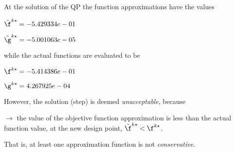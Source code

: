 At the solution of the QP the function approximations have the values

$\tilde \f^{k\star} = -5.429334e-01$

$\tilde \g^{k\star} = -5.001063e-05$

\bigskip
while the actual functions are evaluated to be

$\f^{k\star} = -5.414386e-01$

$\g^{k\star} =  4.267925e-04$

\bigskip
 However, the solution (step)                     is deemed \emph{unacceptable}, because 
 
$\to$ the value of the objective                         function approximation is less than the actual function                         value, at the new design point,                         $\tilde {\f}^{k\star} < {\f}^{k\star}$.

 \bigskip 

 That is, at least one approximation                     function is not \emph{conservative}.
